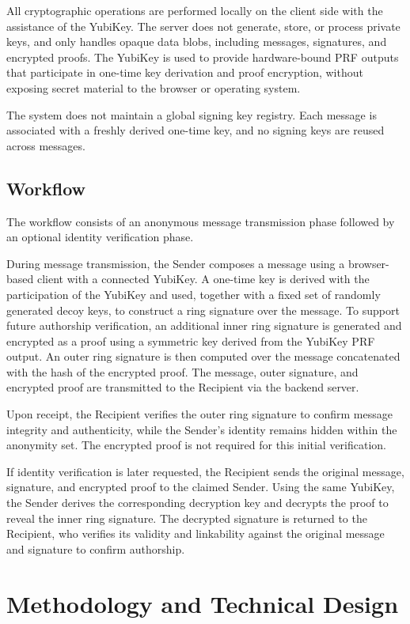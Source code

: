 \documentclass[letterpaper,11pt]{article}
\begin{document}
All cryptographic operations are performed locally on the client side with the assistance of the YubiKey. The server does not generate, store, or process private keys, and only handles opaque data blobs, including messages, signatures, and encrypted proofs. The YubiKey is used to provide hardware-bound PRF outputs that participate in one-time key derivation and proof encryption, without exposing secret material to the browser or operating system.

The system does not maintain a global signing key registry. Each message is associated with a freshly derived one-time key, and no signing keys are reused across messages.

\subsection{Workflow}
The workflow consists of an anonymous message transmission phase followed by an optional identity verification phase.

During message transmission, the Sender composes a message using a browser-based client with a connected YubiKey. A one-time key is derived with the participation of the YubiKey and used, together with a fixed set of randomly generated decoy keys, to construct a ring signature over the message. To support future authorship verification, an additional inner ring signature is generated and encrypted as a proof using a symmetric key derived from the YubiKey PRF output. An outer ring signature is then computed over the message concatenated with the hash of the encrypted proof. The message, outer signature, and encrypted proof are transmitted to the Recipient via the backend server.

Upon receipt, the Recipient verifies the outer ring signature to confirm message integrity and authenticity, while the Sender’s identity remains hidden within the anonymity set. The encrypted proof is not required for this initial verification.

If identity verification is later requested, the Recipient sends the original message, signature, and encrypted proof to the claimed Sender. Using the same YubiKey, the Sender derives the corresponding decryption key and decrypts the proof to reveal the inner ring signature. The decrypted signature is returned to the Recipient, who verifies its validity and linkability against the original message and signature to confirm authorship.


\section{Methodology and Technical Design}
\end{document}
